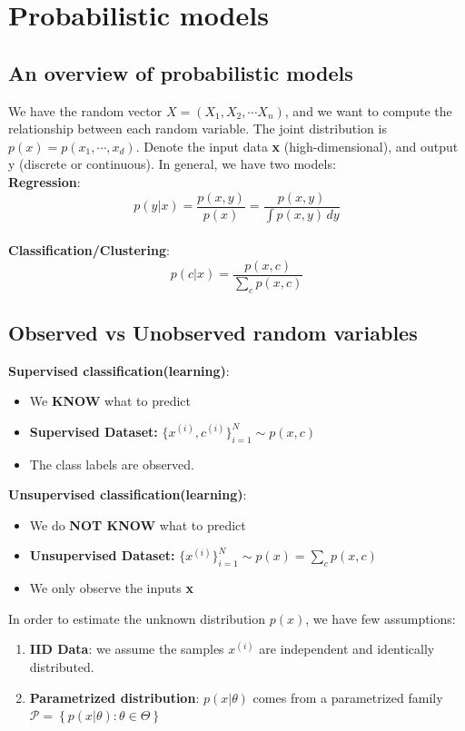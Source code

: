 \section{Probabilistic models}
\subsection{An overview of probabilistic models}
\label{sec:pro-models}
We have the random vector $X=(X_1,X_2,\cdots X_n)$, and we want to compute the relationship between each random variable. The joint distribution is $p(x)=p(x_1,\cdots,x_d)$. Denote the input data \textbf{x} (high-dimensional), and output y (discrete or continuous). In general, we have two models:\\
\newline
\textbf{Regression}: $$p(y | x) = \frac{p(x,y)}{p(x)}=\frac{p(x,y)}{\int p(x,y) \, dy}$$\\
\textbf{Classification/Clustering}: $$p(c | x) = \frac{p(x,c)}{\sum_{c} p(x,c)}$$

\subsection*{Observed vs Unobserved random variables}
\textbf{Supervised classification(learning)}:
\begin{itemize}
    \item We \textbf{KNOW} what to predict
    \item \textbf{Supervised Dataset:} $\{x^{(i)}, c^{(i)}\}_{i=1}^N \sim p(x, c)$
    \item The class labels are observed.
\end{itemize}
\textbf{Unsupervised classification(learning)}:
\begin{itemize}
    \item We do \textbf{NOT KNOW} what to predict
    \item \textbf{Unsupervised Dataset:} $\{x^{(i)}\}_{i=1}^N \sim p(x) = \sum_c p(x,c)$
    \item We only observe the inputs \textbf{x}
\end{itemize}
In order to estimate the unknown distribution $p(x)$, we have few assumptions:
\begin{enumerate}
    \item \textbf{IID Data}: we assume the samples $x^{(i)}$ are independent and identically distributed.
    \item \textbf{Parametrized distribution}: $p(x|\theta)$ comes from a parametrized family $\mathcal{P} = \left\{ p(x | \theta) : \theta \in \Theta \right\}$
\end{enumerate}


